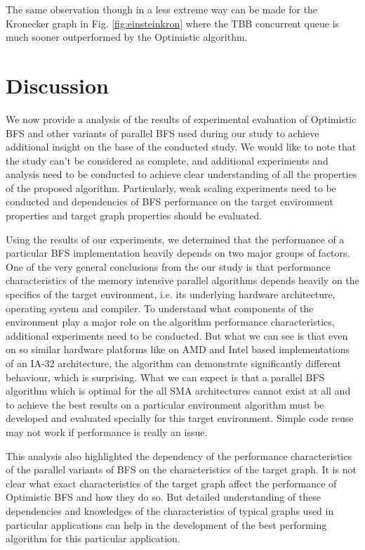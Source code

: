 \documentclass[letterpaper]{article}
\begin{document}
		The same observation though in a less extreme way can be made for the Kronecker graph in Fig. \ref{fig:einsteinkron} where the TBB concurrent queue is much sooner outperformed by the Optimistic algorithm.


	\section{Discussion}\label{sec:disc} %
		We now provide a analysis of the results of experimental evaluation of Optimistic BFS and other variants of parallel BFS used during our study to achieve additional insight on the base of the conducted study.
		We would like to note that the study can't be considered as complete, and additional experiments and analysis need to be conducted to achieve clear understanding of all the properties of the proposed algorithm.  
		Particularly, weak scaling experiments need to be conducted and dependencies of BFS performance on the target environment properties and target graph properties should be evaluated. 
		
		Using the results of our experiments, we determined that the performance of a particular BFS implementation heavily depends on two major groups of factors.
		One of the very general conclusions from the our study is that performance characteristics of the memory intensive parallel algorithms depends heavily on the specifics of the target environment, i.e. its underlying hardware architecture, operating system and compiler.
		To understand what components of the environment play a major role on the algorithm performance characteristics, additional experiments need to be conducted.
		But what we can see is that even on so similar hardware platforms like on AMD and Intel based implementations of an IA-32 architecture, the algorithm can demonstrate significantly different behaviour, which is surprising.
		What we can expect is that a parallel BFS algorithm which is optimal for the all SMA architectures cannot exist at all and to achieve the best results on a particular environment algorithm must be developed and evaluated specially for this target environment.
		Simple code reuse may not work if performance is really an issue.
		
		This analysis also highlighted the dependency of the performance characteristics of the parallel variants of BFS on the characteristics of the target graph.
		It is not clear what exact characteristics of the target graph affect the performance of Optimistic BFS and how they do so. 
		But detailed understanding of these dependencies and knowledges of the characteristics of typical graphs used in particular applications can help in the development of the best performing algorithm for this particular application.
		
\end{document}
